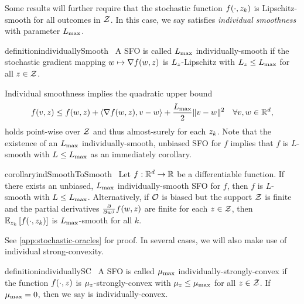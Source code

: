 Some results will further require that the stochastic function \( f(\cdot, \zk) \) is Lipschitz-smooth for all outcomes in \( \calZ \).
In this case, we say \oracle{} satisfies \emph{individual smoothness} with parameter \( \Lmax \).
\begin{restatable}{definition}{individuallySmooth}~\label{def:individually-smooth}
    A \ac{SFO} \oracle{} is called \( \Lmax \) individually-smooth if the stochastic gradient mapping \( \w \mapsto \grad(\w, \z) \) is \( L_{\z} \)-Lipschitz with \( L_{\z} \leq \Lmax \) for all \( \z \in \calZ \).
\end{restatable}
\noindent Individual smoothness implies the quadratic upper bound
\[ f(v, \z) \leq f(\w, \z) + \abr{\grad(\w, \z), v - \w} + \frac{\Lmax}{2}\norm{v - \w}^2 \quad \forall v, \w \in \R^d, \]
holds point-wise over \( \calZ \) and thus almost-surely for each \( \zk \).
Note that the existence of an \( \Lmax \) individually-smooth, unbiased \ac{SFO} for \( f \) implies that \( f \) is \( L \)-smooth with \( L \leq \Lmax \) as an immediately corollary.
\begin{restatable}{corollary}{indSmoothToSmooth}~\label{cor:ind-smooth-to-smooth}
    Let \( f : \R^d \rightarrow \R \) be a differentiable function.  
    If there exists an unbiased, \( \Lmax \) individually-smooth \ac{SFO} \oracle{} for \( f \), then \( f \) is \( L \)-smooth with \( L \leq \Lmax \).
    Alternatively, if \( \oracle{} \) is biased but the support \( \calZ \) is finite and the partial derivatives \( \frac{\partial}{\partial w^j} f(\w, \z) \) are finite for each \( z \in \calZ \), then \( \Ek \sbr{f(\cdot, \zk)} \) is \( \Lmax \)-smooth for all \( k \). 
\end{restatable}
\noindent See \autoref{app:stochastic-oracles} for proof. 
In several cases, we will also make use of individual strong-convexity.
\begin{restatable}{definition}{individuallySC}~\label{def:individually-sc}
    A \ac{SFO} \oracle{} is called \( \mumax \) individually-strongly-convex if the function \( f(\cdot, \z) \) is \( \mu_{\z} \)-strongly-convex with \( \mu_{\z} \leq \mumax \) for all \( \z \in \calZ \).
    If \( \mumax = 0 \), then we say \oracle{} is individually-convex.
\end{restatable}

